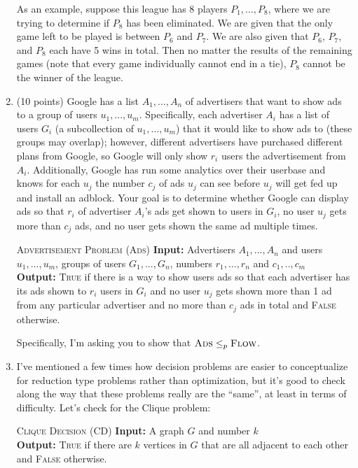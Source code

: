 \documentclass[12pt,letterpaper]{article}
\begin{document}
\begin{enumerate}
    As an example, suppose this league has 8 players $P_1, ..., P_8$, where we are trying to determine if $P_8$ has been eliminated. We are given that the only game left to be played is between $P_6$ and $P_7$.
    We are also given that $P_6$, $P_7$, and $P_8$ each have 5 wins in total. Then no matter the results of the remaining games (note that every game individually cannot end in a tie), $P_8$ cannot be the winner of the league.
    \item (10 points) Google has a list $A_1, ..., A_n$ of advertisers that want to show ads to a group of users $u_1, ..., u_m$. Specifically, each advertiser $A_i$ has a list of users $G_i$ (a subcollection of $u_1, ..., u_m$) that it would like to show ads to (these groups may overlap); however, different advertisers have purchased different plans from Google, so Google will only show $r_i$ users the advertisement from $A_i$. Additionally, Google has run some analytics over their userbase and knows for each $u_j$ the number $c_j$ of ads $u_j$ can see before $u_j$ will get fed up and install an adblock. Your goal is to determine whether Google can display ads so that $r_i$ of advertiser $A_i$'s ads get shown to users in $G_i$, no user $u_j$ gets more than $c_j$ ads, and no user gets shown the same ad multiple times. 
    \begin{beamerlikethm}{\textsc{Advertisement Problem (Ads)}}
        \textbf{Input: }Advertisers $A_1, ..., A_n$ and users $u_1, ..., u_m$, groups of users $G_1, ..., G_n$, numbers $r_1, ..., r_n$ and $c_1, .., c_m$\\
        \textbf{Output: }\textsc{True} if there is a way to show users ads so that each advertiser has its ads shown to $r_i$ users in $G_i$ and no user $u_j$ gets shown more than 1 ad from any particular advertiser and no more than $c_j$ ads in total and \textsc{False} otherwise.
    \end{beamerlikethm}
    Specifically, I'm asking you to show that $\textsc{Ads}\leq_p\textsc{Flow}$.
    \item I've mentioned a few times how decision problems are easier to conceptualize for reduction type problems rather than optimization, but it's good to check along the way that these problems really are the ``same'', at least in terms of difficulty. Let's check for the Clique problem:
    \begin{beamerlikethm}{\textsc{Clique Decision (CD)}}
        \textbf{Input: }A graph $G$ and number $k$ \\
        \textbf{Output: }\textsc{True} if there are $k$ vertices in $G$ that are all adjacent to each other and \textsc{False} otherwise. 

\end{beamerlikethm}
\end{enumerate}
\end{document}
